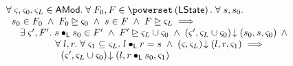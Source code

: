 \newpage	
\begin{lemma}[]\label{lem:amodWitness}
%
\[
\begin{array}{l}
	\for{\amod{}, \amod{0}, \amod{L} \in \AMods} \for{F_0, F \in \pset{\LState}} \for{s, s_0}\\
	\hspace*{0.2cm} s_0 \in F_0 \;\land\; F_0 \strictfences \amod{0} \;\land\; s \in F \;\land\; F \strictfences \amod{L} 
	\implies \\
	\hspace*{0.5cm} \exsts{\amod{}', \fence{}'} s \composeL s_0 \in \fence{}' \;\land\; \fence{}' \strictfences \amod{L} \cup \amod{0} \;\land\; 
	 \extendsAM{\amod{}', \amod{L} \cup \amod{0}}{s_0}{s}{\amod{0}} \;\land\\
	 \hspace*{1.8cm}\for{l, r}\for{\amod{1} \subseteq \amod{L} } l \composeL r = s \;\land\; \extendsAM{\amod{}, \amod{L}}{l}{r}{\amod{1}} \implies\\
	 \hspace*{2cm}  \extendsAM{\amod{}', \amod{L} \cup \amod{0}}{l}{r \composeL s_0}{\amod{1}}


\end{array}\]
\end{lemma}
